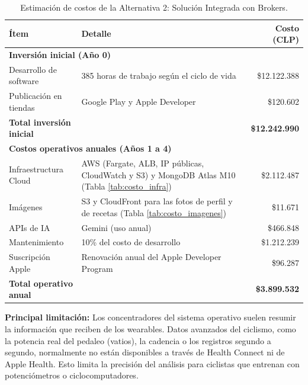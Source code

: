 \begin{table}[h!]
    \centering
    \renewcommand{\arraystretch}{1.4}
    \begin{tabular}{|m{4cm}|m{5.5cm}|r|}
        \hline
        \rowcolor[HTML]{EFEFEF}
        \textbf{Ítem} & \textbf{Detalle} & \textbf{Costo (CLP)} \\ \hline
        \multicolumn{3}{|l|}{\cellcolor[HTML]{E3F2FD}\textbf{Inversión inicial (Año 0)}} \\ \hline
        Desarrollo de software & 385 horas de trabajo según el ciclo de vida & \$12.122.388 \\ \hline
        Publicación en tiendas & Google Play y Apple Developer & \$120.602 \\ \hline
        \rowcolor[HTML]{E8F5E9}
        \textbf{Total inversión inicial} & & \textbf{\$12.242.990} \\ \hline
        \multicolumn{3}{|l|}{\cellcolor[HTML]{FFF3E0}\textbf{Costos operativos anuales (Años 1 a 4)}} \\ \hline
        Infraestructura Cloud & AWS (Fargate, ALB, IP públicas, CloudWatch y S3) y MongoDB Atlas M10 (Tabla \ref{tab:costo_infra}) & \$2.112.487 \\ \hline
        Imágenes & S3 y CloudFront para las fotos de perfil y de recetas (Tabla \ref{tab:costo_imagenes}) & \$11.671 \\ \hline
        APIs de IA & Gemini (uso anual) & \$466.848 \\ \hline
        Mantenimiento & 10\% del costo de desarrollo & \$1.212.239 \\ \hline
        Suscripción Apple & Renovación anual del Apple Developer Program & \$96.287 \\ \hline
        \rowcolor[HTML]{FFF3E0}
        \textbf{Total operativo anual} & & \textbf{\$3.899.532} \\ \hline
    \end{tabular}
    \caption{Estimación de costos de la Alternativa 2: Solución Integrada con Brokers.}
    \label{tab:costos_alt2}
\end{table}

\textbf{Principal limitación:} Los concentradores del sistema operativo suelen resumir la información que reciben de los wearables. Datos avanzados del ciclismo, como la potencia real del pedaleo (vatios), la cadencia o los registros segundo a segundo, normalmente no están disponibles a través de Health Connect ni de Apple Health. Esto limita la precisión del análisis para ciclistas que entrenan con potenciómetros o ciclocomputadores.

